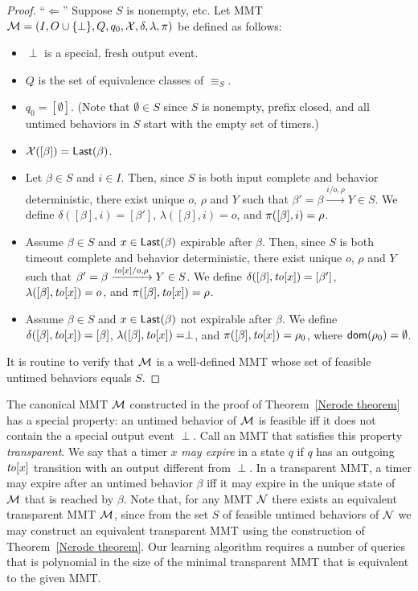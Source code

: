 \begin{proof}
``$\Leftarrow$'' Suppose $S$ is nonempty, etc.
Let MMT ${\cal M} = (I, O \cup \{ \perp \}, Q, q_0, \mathcal{X}, \delta, \lambda, \pi)$ be defined as follows:
\begin{itemize}
\item
$\perp$ is a special, fresh output event.
\item
$Q$ is the set of equivalence classes of $\equiv_S$.
\item
$q_0 = [\emptyset]$. (Note that $\emptyset \in S$ since $S$ is nonempty, prefix closed, and all untimed behaviors in $S$ start
with the empty set of timers.)
\item
$\mathcal{X}([\beta]) = \mathsf{Last}({\beta})$.
\item
Let $\beta \in S$ and $i \in I$. Then, since $S$ is both input complete and behavior deterministic, there exist unique
$o$, $\rho$ and $Y$ such that $\beta' = \beta \xrightarrow{i/o, \rho} Y \in S$.
We define $\delta([\beta],i) = [\beta']$, $\lambda([\beta],i) = o$, and $\pi([\beta],i) = \rho$.
\item
Assume $\beta \in S$ and $x\in \mathsf{Last}({\beta})$ expirable after $\beta$. 
Then, since $S$ is both timeout complete and behavior deterministic, there exist unique
$o$, $\rho$ and $Y$ such that $\beta' = \beta \xrightarrow{\mathit{to}[x]/o, \rho} Y \in S$.
We define $\delta([\beta],\mathit{to}[x]) = [\beta']$, $\lambda([\beta],\mathit{to}[x]) = o$, and $\pi([\beta],\mathit{to}[x]) = \rho$.
\item
Assume $\beta \in S$ and $x \in \mathsf{Last}({\beta})$ not expirable after $\beta$.
We define $\delta([\beta],\mathit{to}[x]) = [\beta]$, $\lambda([\beta],\mathit{to}[x]) = \perp$, and $\pi([\beta],\mathit{to}[x]) = \rho_0$, where ${\textsf{dom}}(\rho_0) = \emptyset$.
\end{itemize}
It is routine to verify that ${\cal M}$ is a well-defined MMT whose set of feasible untimed behaviors equals $S$.
\end{proof}
\fi

The canonical MMT ${\cal M}$ constructed in the proof of Theorem~\ref{Nerode theorem} has a special property: an untimed
behavior of ${\cal M}$ is feasible iff it does not contain
\iflong
the
\else
a
\fi
special output event $\perp$. Call an MMT that satisfies this property
\emph{transparent}. 
We say that a timer $x$ \emph{may expire} in a state $q$ if $q$ has an outgoing $\mathit{to}[x]$ transition with
an output different from $\perp$.
In a transparent MMT, a timer may expire after an untimed behavior $\beta$ iff it may expire in the
unique state of ${\cal M}$ that is reached by $\beta$.
%
Note that, for any MMT ${\cal N}$ there exists an equivalent transparent MMT ${\cal M}$, since
from the set $S$ of feasible untimed behaviors of ${\cal N}$ we may construct an equivalent transparent MMT using the construction
of Theorem~\ref{Nerode theorem}.
Our learning algorithm requires a number of queries that is polynomial in the size of the minimal transparent MMT that is equivalent to the given MMT.

